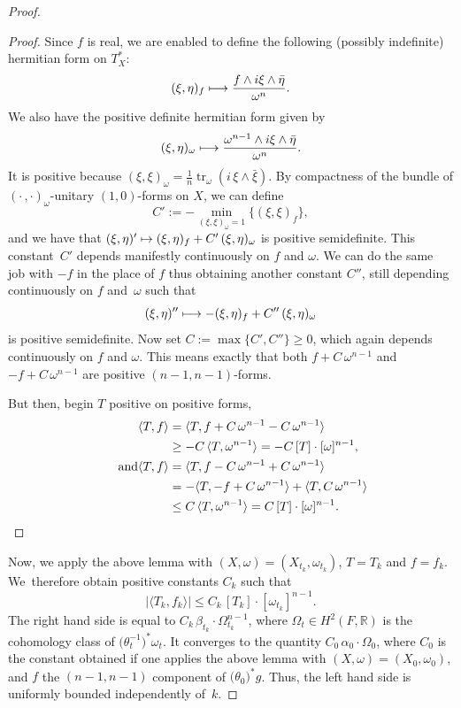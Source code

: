 \documentclass[JEP,XML,SOM,Unicode,NoEqCountersInSection,published]{cedram}
\newcommand\mto{\mathchoice{\longmapsto}{\mapsto}{\mapsto}{\mapsto}}
\theoremstyle{plain}
\theoremstyle{definition}
\DeclareMathOperator{\tr}{tr}
\begin{document}
\begin{appendix}
\begin{proof}
\begin{proof}
Since $f$ is real, we are enabled to define the following (possibly indefinite) hermitian form on $T_X^*$:
\[
(\xi,\eta)_f\mto \frac{f\wedge i\xi\wedge\bar\eta}{\omega^n}.
\]
We also have the positive definite hermitian form given by
\[
(\xi,\eta)_\omega\mto \frac{\omega^{n-1}\wedge i\xi\wedge\bar\eta}{\omega^n}.
\]
It is positive because $(\xi,\xi)_\omega=\frac 1n\tr_\omega(i\,\xi\wedge\bar\xi)$.
By compactness of the bundle of $(\cdot\,,\cdot)_\omega$-unitary $(1,0)$-forms on $X$, we can define
\[
C':=-\min_{(\xi,\xi)_\omega=1}\{(\xi,\xi)_f\},
\]
and we have that $(\xi,\eta)'\mto (\xi,\eta)_f+C'\,(\xi,\eta)_\omega$ is positive semidefinite. This constant~$C'$ depends manifestly continuously on $f$ and $\omega$. We can do the same job with $-f$ in the place of $f$ thus obtaining another constant $C''$, still depending continuously on $f$ and~$\omega$ such that
\[
(\xi,\eta)''\mto -(\xi,\eta)_f+C''\,(\xi,\eta)_\omega
\]
is positive semidefinite. Now set $C:=\max\{C',C''\}\ge 0$, which again depends continuously on $f$ and $\omega$. This means exactly that both $f+C\,\omega^{n-1}$ and $-f+C\,\omega^{n-1}$ are positive $(n-1,n-1)$-forms.

But then, begin $T$ positive on positive forms,
\begin{align*}
\langle T, f\rangle &= \langle T, f+C\,\omega^{n-1}-C\,\omega^{n-1}\rangle \\
&\ge -C\,\langle T, \omega^{n-1}\rangle=-C\, [T]\cdot[\omega]^{n-1},
\\
\tag*{and}
\langle T, f\rangle &= \langle T, f-C\,\omega^{n-1}+C\,\omega^{n-1}\rangle \\
&= -\langle T,-f+C\,\omega^{n-1}\rangle+\langle T, C\,\omega^{n-1}\rangle\\
& \le C\,\langle T, \omega^{n-1}\rangle=C\, [T]\cdot[\omega]^{n-1}.\qedhere
\end{align*}
\end{proof}

Now, we apply the above lemma with $(X,\omega)=(X_{t_k},\omega_{t_k})$, $T=T_k$ and $f=f_k$. We~therefore obtain positive constants $C_k$ such that
\[
|\langle T_k,f_k\rangle|\le C_k\,[T_k]\cdot[\omega_{t_k}]^{n-1}.
\]
The right hand side is equal to $C_k\,\beta_{t_k}\cdot\Omega_{t_k}^{n-1}$, where $\Omega_t\in H^2(F,\mathbb R)$ is the cohomology class of $\bigl(\theta_t^{-1}\bigr)^*\omega_t$. It converges to the quantity $C_0\,\alpha_0\cdot\Omega_0$, where $C_0$ is the constant obtained if one applies the above lemma with $(X,\omega)=(X_{0},\omega_{0})$, and $f$ the $(n-1,n-1)$ component of $\bigl(\theta_{0}\bigr)^*g$. Thus, the left hand side is uniformly bounded independently of~$k$.


\end{proof}
\end{appendix}
\end{document}

